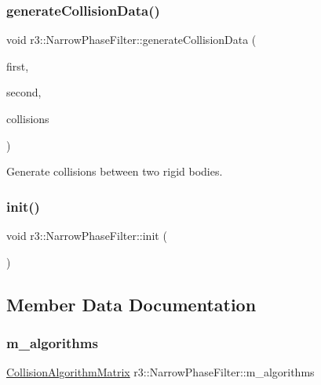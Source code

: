 \subsubsection{\texorpdfstring{generate\+Collision\+Data()}{generateCollisionData()}\hspace{0.1cm}{\footnotesize\ttfamily [2/2]}}
{\footnotesize\ttfamily void r3\+::\+Narrow\+Phase\+Filter\+::generate\+Collision\+Data (\begin{DoxyParamCaption}\item[{\mbox{\hyperlink{classr3_1_1_rigid_body}{Rigid\+Body}} $\ast$}]{first,  }\item[{\mbox{\hyperlink{classr3_1_1_rigid_body}{Rigid\+Body}} $\ast$}]{second,  }\item[{\mbox{\hyperlink{classr3_1_1_collision_data}{Collision\+Data}} \&}]{collisions }\end{DoxyParamCaption})}

Generate collisions between two rigid bodies. \mbox{\label{classr3_1_1_narrow_phase_filter_a09742dd02960fab328444144fb22b85b}} 
\subsubsection{\texorpdfstring{init()}{init()}}
{\footnotesize\ttfamily void r3\+::\+Narrow\+Phase\+Filter\+::init (\begin{DoxyParamCaption}{ }\end{DoxyParamCaption})\hspace{0.3cm}{\ttfamily [protected]}}



\subsection{Member Data Documentation}
\mbox{\label{classr3_1_1_narrow_phase_filter_a476cf750e3cd55d9e36a011eb0c447af}} 
\subsubsection{\texorpdfstring{m\+\_\+algorithms}{m\_algorithms}}
{\footnotesize\ttfamily \mbox{\hyperlink{classr3_1_1_collision_algorithm_matrix}{Collision\+Algorithm\+Matrix}} r3\+::\+Narrow\+Phase\+Filter\+::m\+\_\+algorithms\hspace{0.3cm}{\ttfamily [protected]}}



